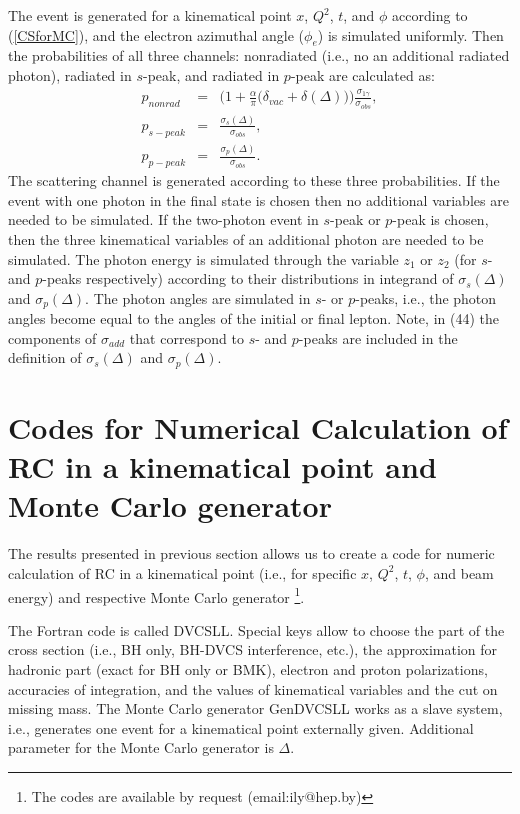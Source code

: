 \documentclass[aps,prd,reprint,groupedaddress,preprintnumbers,showpacs]{revtex4-1}
\begin{document}
The event is generated for a kinematical point $x$, $Q^2$, $t$, and $\phi$  according to (\ref{CSforMC}), 
and the electron azimuthal angle ($\phi_e$) is simulated uniformly. 
Then 
 the probabilities of all three channels: nonradiated (i.e., no an additional radiated photon), radiated in $s$-peak, and radiated in $p$-peak are calculated 
 as:
\begin{eqnarray}
p_{nonrad}&=&\bigl( 1 + \frac{\alpha}{\pi}\bigl( \delta_{vac}+\delta(\Delta)\bigr)\bigr) \frac{\sigma _{1\gamma}}{\sigma_{obs}},
\nonumber\\
p_{s-peak}&=&\frac{\sigma_s(\Delta)}{\sigma_{obs}},
\nonumber\\
p_{p-peak}&=&\frac{\sigma_p(\Delta)}{\sigma_{obs}}.
\end{eqnarray}
The  scattering channel is generated according to these three probabilities. 
If the event with one photon in the final state
is chosen then no additional variables are needed to be simulated.
If the two-photon event in $s$-peak or $p$-peak is chosen,  
then the three kinematical variables of an additional photon are needed to be simulated. 
The photon energy is simulated through the variable $z_{1}$ or $z_{2}$ (for $s$- and $p$-peaks respectively) according to their distributions in integrand of $\sigma_s(\Delta)$ and $\sigma_p(\Delta)$. The photon angles are simulated in $s$- or $p$-peaks, i.e., the photon angles become equal to the angles of the initial or final lepton. 
Note, in (44) the components of $\sigma_{add}$ that correspond to $s$- and $p$-peaks are included in the definition of
$\sigma_s(\Delta)$ and $\sigma_p(\Delta)$. 

\section{Codes for Numerical Calculation of RC in a kinematical point and Monte Carlo generator}\label{codes}

The results presented in previous section allows us to create a code for numeric calculation of RC in a kinematical point (i.e., for specific $x$, $Q^2$, $t$, $\phi$, and beam energy) and respective Monte Carlo 
generator \footnote{The codes are available by request (email:ily@hep.by)}. 

The Fortran
code is called DVCSLL. Special keys allow to choose the part of the cross section (i.e., BH only, BH-DVCS interference, etc.), the approximation for hadronic part (exact for BH only or BMK), electron and proton  polarizations,  accuracies of integration, and the values of kinematical variables and the cut on missing mass. The Monte Carlo generator GenDVCSLL works as a slave system, i.e., generates one event for a kinematical point externally given. Additional parameter for the Monte Carlo generator is $\Delta$. 
\end{document}
